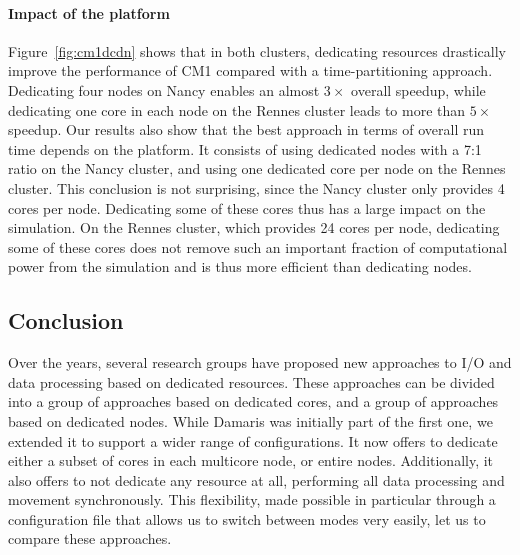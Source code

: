 \paragraph{Impact of the platform} Figure~\ref{fig:cm1dcdn} shows that in both clusters, dedicating resources drastically 
improve the performance of CM1 compared with a time-partitioning approach. 
Dedicating four nodes on Nancy enables an almost $3\times$ overall speedup, while
dedicating one core in each node on the Rennes cluster leads to more than $5\times$ speedup.
Our results also show that the best approach in terms of overall run time depends on the platform. It consists of 
using dedicated nodes with a 7:1 ratio on the Nancy cluster, and using one dedicated core per node on the Rennes cluster. 
This conclusion is not surprising, since the Nancy cluster only provides 4 cores per node. Dedicating some of these
cores thus has a large impact on the simulation. On the Rennes cluster, which provides 24 cores per node, dedicating
some of these cores does not remove such an important fraction of computational power from the simulation and is
thus more efficient than dedicating nodes.

\subsection{Conclusion}

Over the years, several research groups have proposed new approaches to I/O and data processing
based on dedicated resources. These approaches can be divided into a group of approaches based on dedicated
cores, and a group of approaches based on dedicated nodes. While Damaris was initially part of the first one,
we extended it to support a wider range of configurations. It now offers to dedicate either a subset of cores
in each multicore node, or entire nodes. Additionally, it also offers to not dedicate any resource at all,
performing all data processing and movement synchronously. This flexibility, made possible in particular
through a configuration file that allows us to switch between modes very easily, let us to compare these
approaches.


